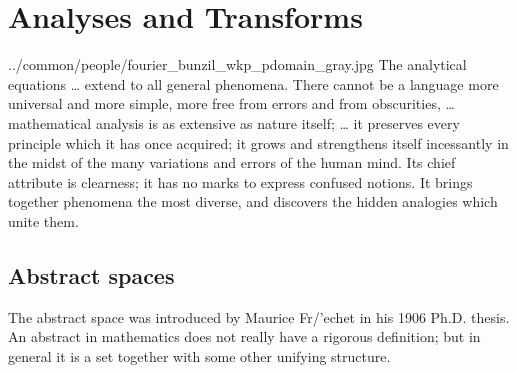 ﻿%
\chapter{Analyses and Transforms}
  {../common/people/fourier_bunzil_wkp_pdomain_gray.jpg}
  {%
  The analytical equations
  \ldots
  extend to all general phenomena. 
  There cannot be a language more universal and more simple, 
  more free from errors and from obscurities, 
  \ldots
  mathematical analysis is as extensive as nature itself; 
  \ldots
  it preserves every principle which it has once acquired; 
  it grows and strengthens itself incessantly in the midst of the many variations and errors of the human mind. 
  Its chief attribute is clearness; it has no marks to express confused notions. 
  It brings together phenomena the most diverse, and discovers the hidden analogies which unite them.
  }
\section{Abstract spaces}
The abstract space was introduced by Maurice Fr{/'e}chet in his 1906 Ph.D. thesis.
An abstract  in mathematics does not really have a rigorous definition;
but in general it is a set together with some other unifying structure.

